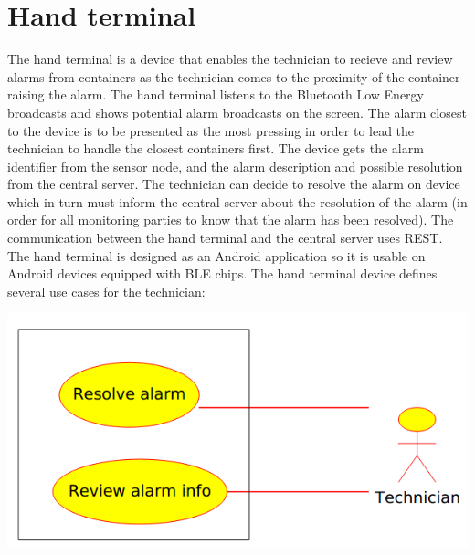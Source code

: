 \smallskip

\section{Hand terminal}
\label{sec:terminal}

The hand terminal is a device that enables the technician to recieve and review alarms from containers as the technician comes to the proximity of the container raising the alarm. The hand terminal listens to the Bluetooth Low Energy broadcasts and shows potential alarm broadcasts on the screen. The alarm closest to the device is to be presented as the most pressing in order to lead the technician to handle the closest containers first. The device gets the alarm identifier from the sensor node, and the alarm description and possible resolution from the central server. The technician can decide to resolve the alarm on device which in turn must inform the central server about the resolution of the alarm (in order for all monitoring parties to know that the alarm has been resolved). The communication between the hand terminal and the central server uses REST. The hand terminal is designed as an Android application so it is usable on Android devices equipped with BLE chips. The hand terminal device defines several use cases for the technician:

\smallskip
\includegraphics[scale=0.6]{gfx/handterminal}
\smallskip


